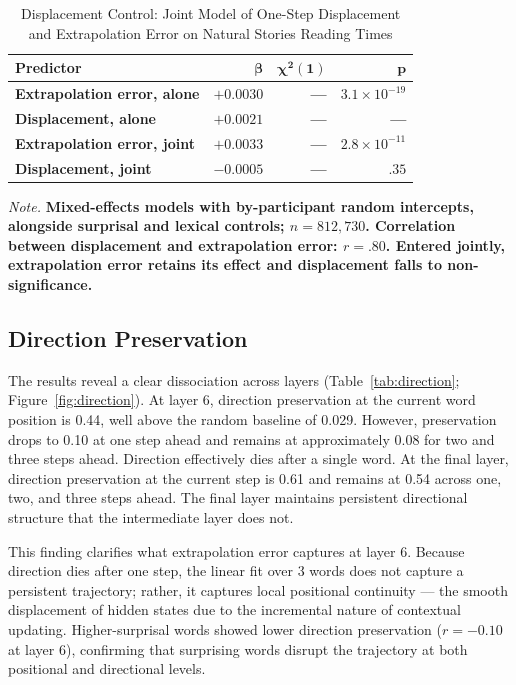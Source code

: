 \documentclass[12pt]{article}
\newcommand{\new}[1]{{\bfseries #1}}
\begin{document}
\begin{table}[!htbp]
\centering
\caption{Displacement Control: Joint Model of One-Step Displacement and Extrapolation Error on Natural Stories Reading Times}
\label{tab:displacement}
\begin{tabular}{lrrr}
\toprule
\textbf{Predictor} & $\boldsymbol{\beta}$ & $\boldsymbol{\chi^2(1)}$ & $\boldsymbol{p}$ \\
\midrule
\new{Extrapolation error, alone} & \new{$+0.0030$} & \new{---} & \new{$3.1 \times 10^{-19}$} \\
\new{Displacement, alone} & \new{$+0.0021$} & \new{---} & \new{---} \\
\new{Extrapolation error, joint} & \new{$+0.0033$} & \new{---} & \new{$2.8 \times 10^{-11}$} \\
\new{Displacement, joint} & \new{$-0.0005$} & \new{---} & \new{$.35$} \\
\bottomrule
\end{tabular}

\smallskip
\footnotesize
\textit{Note.} \new{Mixed-effects models with by-participant random intercepts, alongside surprisal and lexical controls; $n = 812{,}730$. Correlation between displacement and extrapolation error: $r = .80$. Entered jointly, extrapolation error retains its effect and displacement falls to non-significance.}
\end{table}

\subsection{Direction Preservation}

The results reveal a clear dissociation across layers (Table~\ref{tab:direction}; Figure~\ref{fig:direction}). At layer 6, direction preservation at the current word position is 0.44, well above the random baseline of 0.029. However, preservation drops to 0.10 at one step ahead and remains at approximately 0.08 for two and three steps ahead. Direction effectively dies after a single word. At the final layer, direction preservation at the current step is 0.61 and remains at 0.54 across one, two, and three steps ahead. The final layer maintains persistent directional structure that the intermediate layer does not.

This finding clarifies what extrapolation error captures at layer 6. Because direction dies after one step, the linear fit over 3 words does not capture a persistent trajectory; rather, it captures local positional continuity --- the smooth displacement of hidden states due to the incremental nature of contextual updating. Higher-surprisal words showed lower direction preservation ($r = -0.10$ at layer 6), confirming that surprising words disrupt the trajectory at both positional and directional levels.
\end{document}
